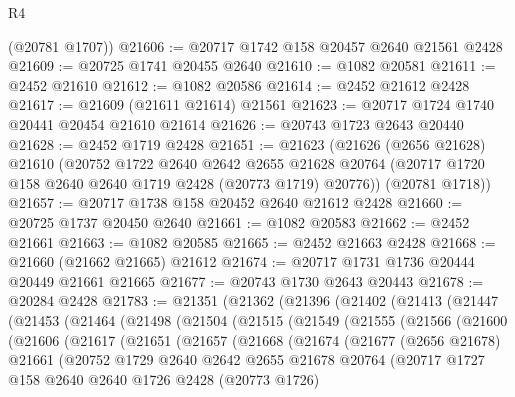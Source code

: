 \begin{lexlean}{R4}
\begin{coremodule}
      (@20781 @1707))
@21606 := @20717 @1742 @158 @20457 @2640 @21561 @2428
@21609 := @20725 @1741 @20455 @2640
@21610 := @1082 @20581
@21611 := @2452 @21610
@21612 := @1082 @20586
@21614 := @2452 @21612 @2428
@21617 := @21609 (@21611 @21614) @21561
@21623 := @20717 @1724 @1740 @20441 @20454 @21610 @21614
@21626 := @20743 @1723 @2643 @20440
@21628 := @2452 @1719 @2428
@21651 := @21623
    (@21626
      (@2656 @21628)
      @21610
      (@20752
        @1722
        @2640
        @2642
        @2655
        @21628
        @20764
        (@20717 @1720 @158 @2640 @2640 @1719 @2428 (@20773 @1719) @20776))
      (@20781 @1718))
@21657 := @20717 @1738 @158 @20452 @2640 @21612 @2428
@21660 := @20725 @1737 @20450 @2640
@21661 := @1082 @20583
@21662 := @2452 @21661
@21663 := @1082 @20585
@21665 := @2452 @21663 @2428
@21668 := @21660 (@21662 @21665) @21612
@21674 := @20717 @1731 @1736 @20444 @20449 @21661 @21665
@21677 := @20743 @1730 @2643 @20443
@21678 := @20284 @2428
@21783 := @21351
    (@21362
      (@21396
        (@21402
          (@21413
            (@21447
              (@21453
                (@21464
                  (@21498
                    (@21504
                      (@21515
                        (@21549
                          (@21555
                            (@21566
                              (@21600
                                (@21606
                                  (@21617
                                    (@21651
                                      (@21657
                                        (@21668
                                          (@21674
                                            (@21677
                                              (@2656 @21678)
                                              @21661
                                              (@20752
                                                @1729
                                                @2640
                                                @2642
                                                @2655
                                                @21678
                                                @20764
                                                (@20717
                                                  @1727
                                                  @158
                                                  @2640
                                                  @2640
                                                  @1726
                                                  @2428
                                                  (@20773 @1726)

\end{coremodule}
\end{lexlean}
